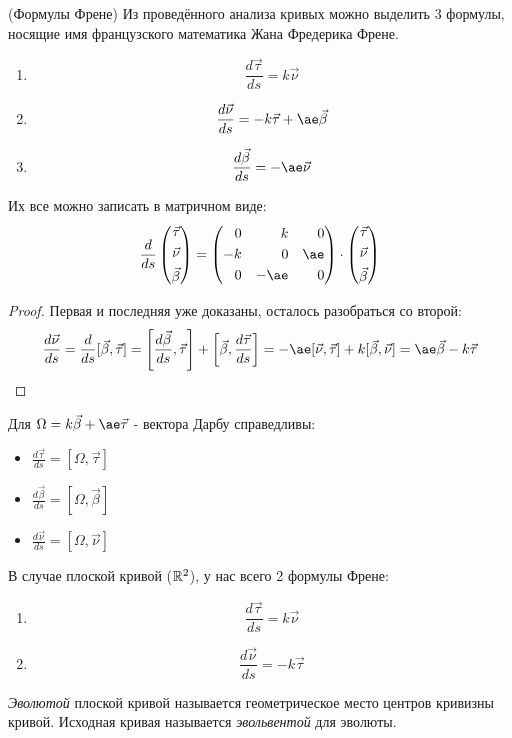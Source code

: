 \begin{theorem} (Формулы Френе)
	Из проведённого анализа кривых можно выделить 3 формулы, носящие имя французского математика Жана Фредерика Френе.
	\begin{enumerate}
		\item \[
			\frac{d\vec{\tau}}{ds} = k\vec{\nu}
		\]
		
		\item \[
			\frac{d\vec{\nu}}{ds} = -k\vec{\tau} + \ae\vec{\beta}
		\]
		
		\item \[
			\frac{d\vec{\beta}}{ds} = -\ae\vec{\nu}
		\]
	\end{enumerate}
	Их все можно записать в матричном виде:
	\[
		\frac{d}{ds}\Matrix{\vec{\tau} \\ \vec{\nu} \\ \vec{\beta}} = \Matrix{0& & k& & 0 \\ -k& & 0& & \ae \\ 0& & -\ae& & 0} \cdot \Matrix{\vec{\tau} \\ \vec{\nu} \\ \vec{\beta}}
	\]
\end{theorem}

\begin{proof}
	Первая и последняя уже доказаны, осталось разобраться со второй:
	\[
		\frac{d\vec{\nu}}{ds} = \frac{d}{ds}[\vec{\beta}, \vec{\tau}] = \left[\frac{d\vec{\beta}}{ds}, \vec{\tau}\right] + \left[\vec{\beta}, \frac{d\vec{\tau}}{ds}\right] = -\ae [\vec{\nu}, \vec{\tau}] + k[\vec{\beta}, \vec{\nu}] = \ae \vec{\beta} - k\vec{\tau}
	\]
\end{proof}

\begin{note}
	Для $\Omega = k\vec{\beta} + \ae\vec{\tau}$ - вектора Дарбу справедливы:
	\begin{itemize}
		\item $\frac{d\vec{\tau}}{ds} = [\Omega, \vec{\tau}]$
		\item $\frac{d\vec{\beta}}{ds} = [\Omega, \vec{\beta}]$
		\item $\frac{d\vec{\nu}}{ds} = [\Omega, \vec{\nu}]$
	\end{itemize}
\end{note}

\begin{definition}
	В случае плоской кривой ($\mathbb{R}^2$), у нас всего 2 формулы Френе:
	\begin{enumerate}
		\item \[
			\frac{d\vec{\tau}}{ds} = k\vec{\nu}
		\]
		
		\item \[
			\frac{d\vec{\nu}}{ds} = -k\vec{\tau}
		\]
	\end{enumerate}
	\textit{Эволютой} плоской кривой называется геометрическое место центров кривизны кривой. Исходная кривая называется \textit{эвольвентой} для эволюты.
\end{definition}

